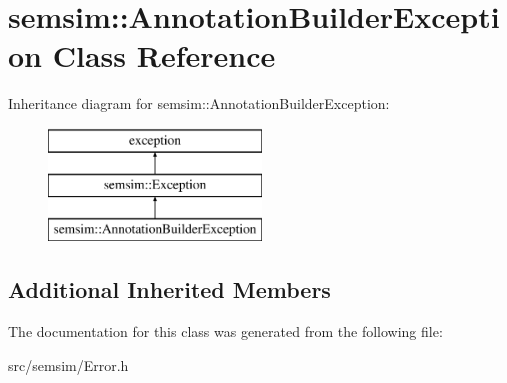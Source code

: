 \hypertarget{classsemsim_1_1AnnotationBuilderException}{}\section{semsim\+:\+:Annotation\+Builder\+Exception Class Reference}
\label{classsemsim_1_1AnnotationBuilderException}
Inheritance diagram for semsim\+:\+:Annotation\+Builder\+Exception\+:\begin{figure}[H]
\begin{center}
\leavevmode
\includegraphics[height=3.000000cm]{classsemsim_1_1AnnotationBuilderException}
\end{center}
\end{figure}
\subsection*{Additional Inherited Members}


The documentation for this class was generated from the following file\+:\begin{DoxyCompactItemize}
\item 
src/semsim/Error.\+h\end{DoxyCompactItemize}
